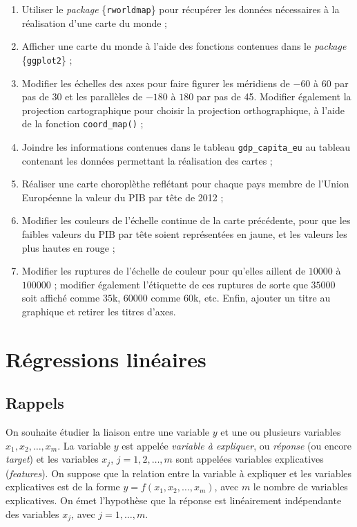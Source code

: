\documentclass[
  11pt,
]{book}
\makeatletter
\numberwithin{equation}{section}
\numberwithin{countremarque}{section}
\newenvironment{exframe}{%
 \def\at@end@of@exframe{}%
 \ifinner\ifhmode%
  \def\at@end@of@exframe{\end{minipage}}%
  \begin{minipage}{\columnwidth}%
 \fi\fi%
 \def\FrameCommand##1{\hskip\@totalleftmargin \hskip-\fboxsep
 \colorbox{shadecolorex}{##1}\hskip-\fboxsep
     \hskip-\linewidth \hskip-\@totalleftmargin \hskip\columnwidth}%
 \MakeFramed {\advance\hsize-\width
   \@totalleftmargin\z@ \linewidth\hsize
   \@setminipage}}%
 {\par\unskip\endMakeFramed%
 \at@end@of@exframe}
\makeatother
\begin{document}
\begin{exframe}
\begin{enumerate}
\def\labelenumi{\arabic{enumi}.}
\setcounter{enumi}{3}
\item
  Utiliser le \emph{package} \{\texttt{rworldmap}\} pour récupérer les données nécessaires à la réalisation d'une carte du monde ;
\item
  Afficher une carte du monde à l'aide des fonctions contenues dans le \emph{package} \{\texttt{ggplot2}\} ;
\item
  Modifier les échelles des axes pour faire figurer les méridiens de \(-60\) à \(60\) par pas de 30 et les parallèles de \(-180\) à \(180\) par pas de 45. Modifier également la projection cartographique pour choisir la projection orthographique, à l'aide de la fonction \texttt{coord\_map()} ;
\item
  Joindre les informations contenues dans le tableau \texttt{gdp\_capita\_eu} au tableau contenant les données permettant la réalisation des cartes ;
\item
  Réaliser une carte choroplèthe reflétant pour chaque pays membre de l'Union Européenne la valeur du PIB par tête de 2012 ;
\item
  Modifier les couleurs de l'échelle continue de la carte précédente, pour que les faibles valeurs du PIB par tête soient représentées en jaune, et les valeurs les plus hautes en rouge ;
\item
  Modifier les ruptures de l'échelle de couleur pour qu'elles aillent de \(10000\) à \(100000\) ; modifier également l'étiquette de ces ruptures de sorte que \(35000\) soit affiché comme \(35\)k, \(60000\) comme \(60\)k, etc. Enfin, ajouter un titre au graphique et retirer les titres d'axes.
\end{enumerate}
\end{exframe}

\hypertarget{ruxe9gressions-linuxe9aires}{%
\chapter{Régressions linéaires}\label{ruxe9gressions-linuxe9aires}}

\hypertarget{rappels}{%
\section{Rappels}\label{rappels}}

On souhaite étudier la liaison entre une variable \(y\) et une ou plusieurs variables \(x_1, x_2, \ldots, x_m\). La variable \(y\) est appelée \emph{variable à expliquer}, ou \emph{réponse} (ou encore \emph{target}) et les variables \(x_j\), \(j = 1, 2, \ldots, m\) sont appelées variables explicatives (\emph{features}). On suppose que la relation entre la variable à expliquer et les variables explicatives est de la forme \(y = f(x_1, x_2, \ldots, x_m)\), avec \(m\) le nombre de variables explicatives. On émet l'hypothèse que la réponse est linéairement indépendante des variables \(x_j\), avec \(j = 1, \ldots, m\).
\end{document}
